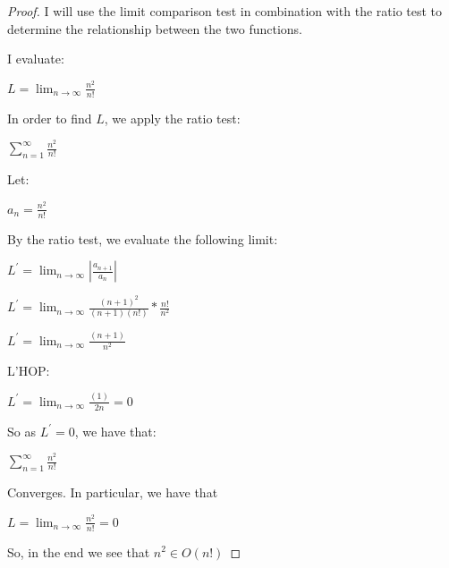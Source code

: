 \documentclass[11pt]{article}
\theoremstyle{definition}
\theoremstyle{definition}
\theoremstyle{definition}
\begin{document}
\begin{proof}
I will use the limit comparison test in combination with the ratio test to determine the relationship between the two functions.

I evaluate:

$L = \lim_{n \to \infty} \frac{n^2}{n!}$

In order to find $L$, we apply the ratio test:

$\sum_{n=1}^{\infty} \frac{n^2}{n!}$

Let:

$a_n = \frac{n^2}{n!}$

By the ratio test, we evaluate the following limit:

$L^{\prime} = \lim_{n \to \infty} |\frac{a_{n+1}}{a_n}|$


$L^{\prime} = \lim_{n \to \infty} \frac{(n+1)^2}{(n+1)(n!)}*\frac{n!}{n^2}$

$L^{\prime} = \lim_{n \to \infty} \frac{(n+1)}{n^2}$

L'HOP:

$L^{\prime} = \lim_{n \to \infty} \frac{(1)}{2n}=0$

So as $L^{\prime} =0$, we have that: 

$\sum_{n=1}^{\infty} \frac{n^2}{n!}$

Converges. In particular, we have that 

$L = \lim_{n \to \infty} \frac{n^2}{n!} = 0$

So, in the end we see that $n^2 \in O(n!)$

\end{proof}




\end{document}
